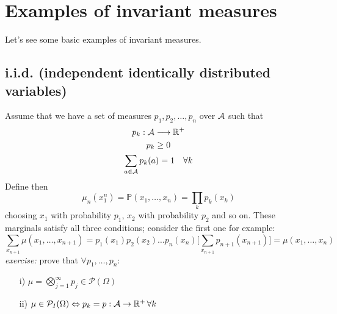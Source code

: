 \section{Examples of invariant measures}
Let's see some basic examples of invariant measures.
\subsection{i.i.d. (independent identically distributed variables)}
Assume that we have a set of measures $p_1,p_2, \dots, p_n$ over $\mathcal{A}$ such that 
\begin{gather}
    p_k : \mathcal{A} \longrightarrow \mathbb{R}^+ \nonumber \\ 
    p_k \geq 0 \nonumber \\
    \sum_{a \in \mathcal{A}} p_k(a) = 1 \quad \forall k 
\end{gather}
Define then 
\begin{equation}
    \mu_n(x_1^n) = \mathbb{P}(x_1, \dots, x_n) = \prod_k p_k(x_k)
\end{equation}
choosing $x_1$ with probability $p_1$, $x_2$ with probability $p_2$ and so on. These marginals satisfy all three conditions; consider the first one for example:
\begin{equation*}
    \sum_{x_{n+1}}\mu(x_1 , \dots, x_{n+1}) = p_1(x_1) p_2(x_2) \dots p_n(x_n) \bigg[ \sum_{x_{n+1}} p_{n+1} (x_{n+1}) \bigg] = \mu(x_1 , \dots, x_n)
\end{equation*}
\textit{exercise:} prove that $\forall p_1, \dots, p_n$:
\begin{itemize}
    \item[i)] $\mu = \bigotimes_{j=1}^{\infty}p_j \in \mathcal{P}(\Omega)$
    \item[ii)] $\mu \in \mathcal{P}_I(\Omega) \Leftrightarrow p_k = p : \mathcal{A} \rightarrow \mathbb{R}^+ \, \forall k$
\end{itemize}
